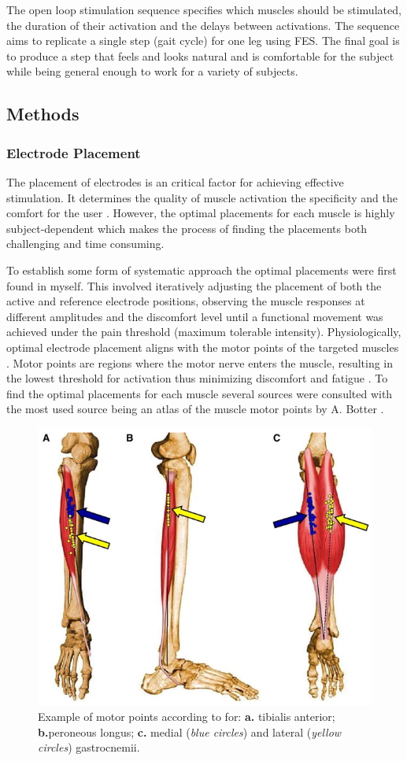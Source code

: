 
The open loop stimulation sequence specifies which muscles should be stimulated, the duration of their activation and the delays between activations. The sequence aims to replicate a single step (gait cycle) for one leg using FES. The final goal is to produce a step that feels and looks natural and is comfortable for the subject while being general enough to work for a variety of subjects.

\subsection{Methods}
\subsubsection{Electrode Placement}
The placement of electrodes is an critical factor for achieving effective stimulation. It determines the quality of muscle activation the specificity and the comfort for the user . However, the optimal placements for each muscle is highly subject-dependent  which makes the process of finding the placements both challenging and time consuming.

To establish some form of systematic approach the optimal placements were first found in myself. This involved iteratively adjusting the placement of both the active and reference electrode positions, observing the muscle responses at different amplitudes and the discomfort level until a functional movement was achieved under the pain threshold (maximum tolerable intensity). Physiologically, optimal electrode placement aligns with the motor points of the targeted muscles \cite{gobbo_muscle_2014}. Motor points are regions where the motor nerve enters the muscle, resulting in the lowest threshold for activation thus minimizing discomfort and fatigue \cite{gobbo_muscle_2014}. To find the optimal placements for each muscle several sources were consulted with the most used source being an atlas of the muscle motor points by A. Botter \cite{botter_atlas_2011}. 

\begin{figure}
    \centering
    \includegraphics[width=0.6\linewidth]{images/screenshotmotorpoint.png}
    \caption{Example of motor points according to \cite{botter_atlas_2011} for: \textbf{a.} tibialis anterior; \textbf{b.}peroneous longus; \textbf{c.} medial (\textit{blue circles}) and lateral (\textit{yellow circles}) gastrocnemii. }
    \label{fig:motor-points}
\end{figure}

